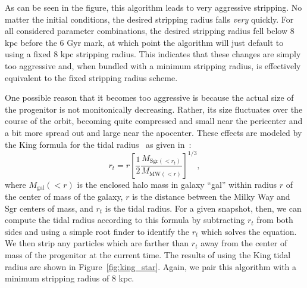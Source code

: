 As can be seen in the figure, this algorithm leads to very aggressive stripping.
No matter the initial conditions, the desired stripping radius falls
\textit{very} quickly. For all considered parameter combinations, the desired
stripping radius fell below 8 kpc before the 6 Gyr mark, at which point the
algorithm will just default to using a fixed 8 kpc stripping radius. This
indicates that these changes are simply too aggressive and, when bundled with a
minimum stripping radius, is effectively equivalent to the fixed stripping
radius scheme.

One possible reason that it becomes too aggressive is because the actual
size of the progenitor is not monitonically decreasing.  Rather, its size
fluctuates over the course of the orbit, becoming quite compressed and small
near the pericenter and a bit more spread out and large near the apocenter.
These effects are modeled by the King formula for the tidal
radius~\cite{king_structure_1962} as given in~\cite{dierickx_predicted_2017}:
\begin{equation} \label{eq:king_radius}
    r_t = r \left[ \frac{1}{2} 
    \frac{M_{\text{Sgr}(<r_t)}}{M_{\text{MW}(<r)}} \right]^{1/3},
\end{equation}
where $M_{\text{gal}}(<r)$ is the enclosed halo mass in galaxy ``gal'' within
radius $r$ of the center of mass of the galaxy, $r$ is the distance between
the Milky Way and Sgr centers of mass, and $r_t$ is the tidal radius.  For a
given snapshot, then, we can compute the tidal radius according to this
formula by subtracting $r_t$ from both sides and using a simple root finder to
identify the $r_t$ which solves the equation.  We then strip any particles
which are farther than $r_t$ away from the center of mass of the progenitor at
the current time. The results of using the King tidal radius are shown in
Figure~\ref{fig:king_star}. Again, we pair this algorithm with a minimum
stripping radius of 8 kpc.

